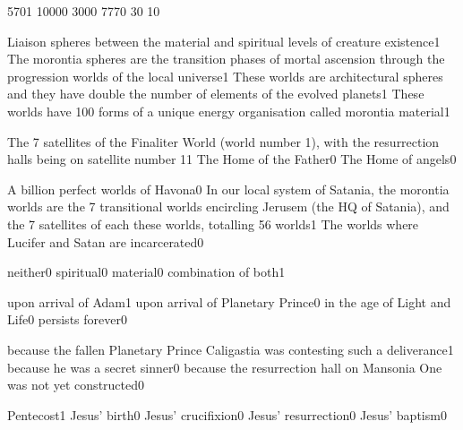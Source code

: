 {570}{1}
{1000}{0}
{300}{0}
{777}{0}
{3}{0}
{1}{0}
\qstop

{Liaison spheres between the material and spiritual levels of creature existence}{1}
{The morontia spheres are the transition phases of mortal ascension through the progression worlds of the local universe}{1}
{These worlds are architectural spheres and they have double the number of elements of the evolved planets}{1}
{These worlds have 100 forms of a unique energy organisation called morontia material}{1}
\qstop

{The 7 satellites of the Finaliter World (world number 1), with the resurrection halls being on satellite number 1}{1}
{The Home of the Father}{0}
{The Home of angels}{0}
\qstop

{A billion perfect worlds of Havona}{0}
{In our local system of Satania, the morontia worlds are the 7 transitional worlds encircling Jerusem (the HQ of Satania), and the 7 satellites of each these worlds, totalling 56 worlds}{1}
{The worlds where Lucifer and Satan are incarcerated}{0}
\qstop

{neither}{0}
{spiritual}{0}
{material}{0}
{combination of both}{1}
\qstop




{upon arrival of Adam}{1}
{upon arrival of Planetary Prince}{0}
{in the age of Light and Life}{0}
{persists forever}{0}
\qstop


{because the fallen Planetary Prince Caligastia was contesting such a deliverance}{1}
{because he was a secret sinner}{0}
{because the resurrection hall on Mansonia One was not yet constructed}{0}
\qstop

{Pentecost}{1}
{Jesus' birth}{0}
{Jesus' crucifixion}{0}
{Jesus' resurrection}{0}
{Jesus' baptism}{0}
\qstop

